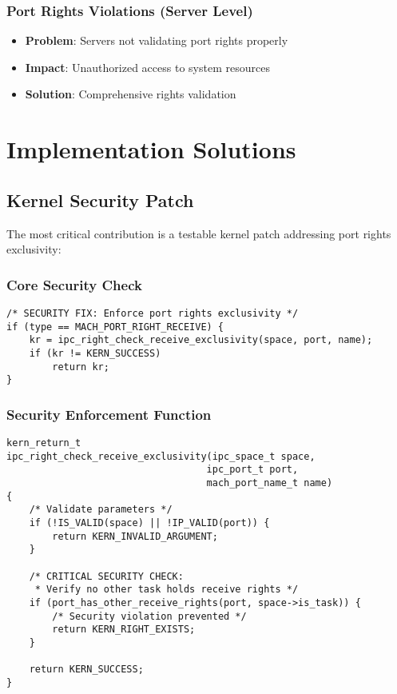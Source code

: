 \documentclass[11pt,a4paper]{article}
\begin{document}
\subsubsection{Port Rights Violations (Server Level)}
\begin{itemize}
    \item \textbf{Problem}: Servers not validating port rights properly
    \item \textbf{Impact}: Unauthorized access to system resources
    \item \textbf{Solution}: Comprehensive rights validation
\end{itemize}

\section{Implementation Solutions}

\subsection{Kernel Security Patch}

The most critical contribution is a testable kernel patch addressing port rights exclusivity:

\subsubsection{Core Security Check}

\begin{lstlisting}[style=cstyle, caption=Kernel Security Enhancement]
/* SECURITY FIX: Enforce port rights exclusivity */
if (type == MACH_PORT_RIGHT_RECEIVE) {
    kr = ipc_right_check_receive_exclusivity(space, port, name);
    if (kr != KERN_SUCCESS)
        return kr;
}
\end{lstlisting}

\subsubsection{Security Enforcement Function}

\begin{lstlisting}[style=cstyle, caption=Exclusivity Enforcement Implementation]
kern_return_t
ipc_right_check_receive_exclusivity(ipc_space_t space, 
                                   ipc_port_t port, 
                                   mach_port_name_t name)
{
    /* Validate parameters */
    if (!IS_VALID(space) || !IP_VALID(port)) {
        return KERN_INVALID_ARGUMENT;
    }
    
    /* CRITICAL SECURITY CHECK:
     * Verify no other task holds receive rights */
    if (port_has_other_receive_rights(port, space->is_task)) {
        /* Security violation prevented */
        return KERN_RIGHT_EXISTS;
    }
    
    return KERN_SUCCESS;
}
\end{lstlisting}
\end{document}
